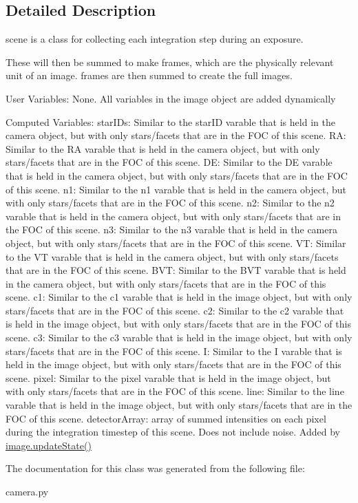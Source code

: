 \subsection{Detailed Description}
scene is a class for collecting each integration step during an exposure. 

These will then be summed to make frames, which are the physically relevant unit of an image. frames are then summed to create the full images.

User Variables\+: None. All variables in the image object are added dynamically

Computed Variables\+: star\+I\+Ds\+: Similar to the star\+ID varable that is held in the camera object, but with only stars/facets that are in the F\+OC of this scene. RA\+: Similar to the RA varable that is held in the camera object, but with only stars/facets that are in the F\+OC of this scene. DE\+: Similar to the DE varable that is held in the camera object, but with only stars/facets that are in the F\+OC of this scene. n1\+: Similar to the n1 varable that is held in the camera object, but with only stars/facets that are in the F\+OC of this scene. n2\+: Similar to the n2 varable that is held in the camera object, but with only stars/facets that are in the F\+OC of this scene. n3\+: Similar to the n3 varable that is held in the camera object, but with only stars/facets that are in the F\+OC of this scene. VT\+: Similar to the VT varable that is held in the camera object, but with only stars/facets that are in the F\+OC of this scene. B\+VT\+: Similar to the B\+VT varable that is held in the camera object, but with only stars/facets that are in the F\+OC of this scene. c1\+: Similar to the c1 varable that is held in the image object, but with only stars/facets that are in the F\+OC of this scene. c2\+: Similar to the c2 varable that is held in the image object, but with only stars/facets that are in the F\+OC of this scene. c3\+: Similar to the c3 varable that is held in the image object, but with only stars/facets that are in the F\+OC of this scene. I\+: Similar to the I varable that is held in the image object, but with only stars/facets that are in the F\+OC of this scene. pixel\+: Similar to the pixel varable that is held in the image object, but with only stars/facets that are in the F\+OC of this scene. line\+: Similar to the line varable that is held in the image object, but with only stars/facets that are in the F\+OC of this scene. detector\+Array\+: array of summed intensities on each pixel during the integration timestep of this scene. Does not include noise. Added by \hyperlink{classcamera_1_1image_ad5fcc766f1a0be37d8437f46d0fe720d}{image.\+update\+State()} 

The documentation for this class was generated from the following file\+:\begin{DoxyCompactItemize}
\item 
camera.\+py\end{DoxyCompactItemize}
